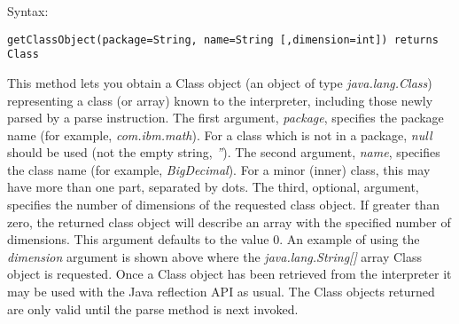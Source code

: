 Syntax:
\begin{verbatim}
getClassObject(package=String, name=String [,dimension=int]) returns Class
\end{verbatim}

This method lets you obtain a Class object (an object of
type \emph{java.lang.Class})  representing a class (or array) known to
the interpreter, including those newly parsed by a parse instruction.
\newline
The first argument, \emph{package}, specifies the package name (for
example, \emph{com.ibm.math}).  For a class which is not in a
package, \emph{null} should be used (not the empty string, \emph{''}).
\newline
The second argument, \emph{name}, specifies the class name (for example,
\emph{BigDecimal}).  For a minor (inner) class, this may have
more than one part, separated by dots.
\newline
The third, optional, argument, specifies the number of dimensions of
the requested class object.  If greater than zero, the returned class
object will describe an array with the specified number of dimensions.
This argument defaults to the value 0.
\newline
An example of using the \emph{dimension} argument is shown above where
the \emph{java.lang.String[]} array Class object is requested.
\newline
Once a Class object has been retrieved from the interpreter it may be
used with the Java reflection API as usual.  The Class objects returned
are only valid until the parse method is next invoked.
